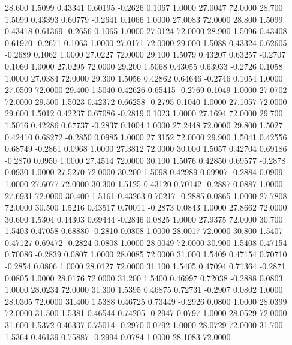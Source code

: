  28.600   1.5099   0.43341   0.60195  -0.2626   0.1067   1.0000  27.0047  72.0000
  28.700   1.5099   0.43393   0.60779  -0.2641   0.1066   1.0000  27.0083  72.0000
  28.800   1.5099   0.43418   0.61369  -0.2656   0.1065   1.0000  27.0124  72.0000
  28.900   1.5096   0.43408   0.61970  -0.2671   0.1063   1.0000  27.0171  72.0000
  29.000   1.5088   0.43324   0.62605  -0.2689   0.1062   1.0000  27.0227  72.0000
  29.100   1.5079   0.43207   0.63257  -0.2707   0.1060   1.0000  27.0295  72.0000
  29.200   1.5068   0.43055   0.63933  -0.2726   0.1058   1.0000  27.0384  72.0000
  29.300   1.5056   0.42862   0.64646  -0.2746   0.1054   1.0000  27.0509  72.0000
  29.400   1.5040   0.42626   0.65415  -0.2769   0.1049   1.0000  27.0702  72.0000
  29.500   1.5023   0.42372   0.66258  -0.2795   0.1040   1.0000  27.1057  72.0000
  29.600   1.5012   0.42237   0.67086  -0.2819   0.1023   1.0000  27.1694  72.0000
  29.700   1.5016   0.42286   0.67737  -0.2837   0.1004   1.0000  27.2448  72.0000
  29.800   1.5027   0.42410   0.68272  -0.2850   0.0985   1.0000  27.3152  72.0000
  29.900   1.5041   0.42556   0.68749  -0.2861   0.0968   1.0000  27.3812  72.0000
  30.000   1.5057   0.42704   0.69186  -0.2870   0.0950   1.0000  27.4514  72.0000
  30.100   1.5076   0.42850   0.69577  -0.2878   0.0930   1.0000  27.5270  72.0000
  30.200   1.5098   0.42989   0.69907  -0.2884   0.0909   1.0000  27.6077  72.0000
  30.300   1.5125   0.43120   0.70142  -0.2887   0.0887   1.0000  27.6931  72.0000
  30.400   1.5161   0.43263   0.70217  -0.2885   0.0865   1.0000  27.7808  72.0000
  30.500   1.5216   0.43517   0.70011  -0.2873   0.0843   1.0000  27.8662  72.0000
  30.600   1.5304   0.44303   0.69444  -0.2846   0.0825   1.0000  27.9375  72.0000
  30.700   1.5403   0.47058   0.68880  -0.2810   0.0808   1.0000  28.0017  72.0000
  30.800   1.5407   0.47127   0.69472  -0.2824   0.0808   1.0000  28.0049  72.0000
  30.900   1.5408   0.47154   0.70086  -0.2839   0.0807   1.0000  28.0085  72.0000
  31.000   1.5409   0.47154   0.70710  -0.2854   0.0806   1.0000  28.0127  72.0000
  31.100   1.5405   0.47094   0.71364  -0.2871   0.0805   1.0000  28.0176  72.0000
  31.200   1.5400   0.46997   0.72038  -0.2888   0.0803   1.0000  28.0234  72.0000
  31.300   1.5395   0.46875   0.72731  -0.2907   0.0802   1.0000  28.0305  72.0000
  31.400   1.5388   0.46725   0.73449  -0.2926   0.0800   1.0000  28.0399  72.0000
  31.500   1.5381   0.46544   0.74205  -0.2947   0.0797   1.0000  28.0529  72.0000
  31.600   1.5372   0.46337   0.75014  -0.2970   0.0792   1.0000  28.0729  72.0000
  31.700   1.5364   0.46139   0.75887  -0.2994   0.0784   1.0000  28.1083  72.0000
